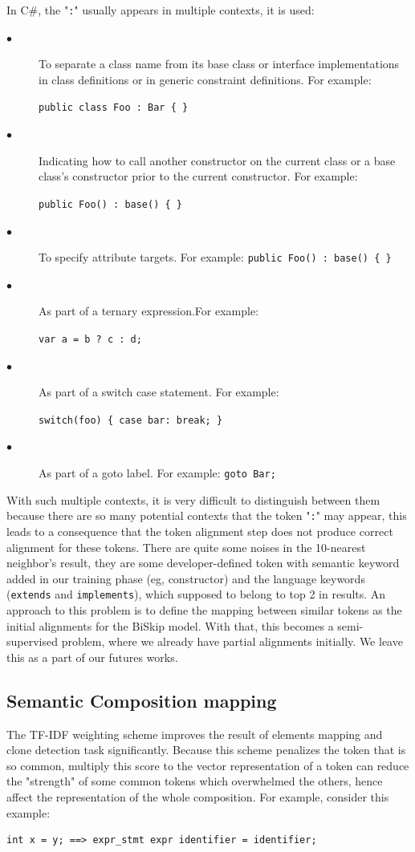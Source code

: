 In C\#, the "\texttt{:}" usually appears in multiple contexts, it is used:

\begin{description}
	\item [$\bullet$] To separate a class name from its base class or interface implementations in class definitions or in generic constraint definitions. For example: 
	
	\texttt{public class Foo : Bar \{ \}}
	\item [$\bullet$] Indicating how to call another constructor on the current class or a base class's constructor prior to the current constructor. For example: 
	
	\texttt{public Foo() : base() \{ \}}
	\item [$\bullet$] To specify attribute targets. For example: \texttt{public Foo() : base() \{ \}}
	\item [$\bullet$] As part of a ternary expression.For example:
	
	\texttt{var a = b ? c : d;}
	\item [$\bullet$] As part of a switch case statement. For example:
	
	\texttt{switch(foo) \{ case bar: break; \}}
	\item [$\bullet$] As part of a goto label. For example:
	\texttt{goto Bar;}
	
\end{description}

With such multiple contexts, it is very difficult to distinguish between them because there are so many potential contexts that the token "\texttt{:}" may appear, this leads to a consequence that the token alignment step does not produce correct alignment for these tokens. There are quite some noises in the 10-nearest neighbor's result, they are some developer-defined token with semantic keyword added in our training phase (eg, constructor) and the language keywords (\texttt{extends} and \texttt{implements}), which supposed to belong to top 2 in results. An approach to this problem is to define the mapping between similar tokens as the initial alignments for the BiSkip model. With that, this becomes a semi-supervised problem, where we already have partial alignments initially. We leave this as a part of our futures works.

\subsection{Semantic Composition mapping}
The TF-IDF weighting scheme improves the result of elements mapping and clone detection task significantly. Because this scheme penalizes the token that is so common, multiply this score to the vector representation of a token can reduce the "strength" of some common tokens which overwhelmed the others, hence affect the representation of the whole composition. For example, consider this example:
\begin{lstlisting}
int x = y; ==> expr_stmt expr identifier = identifier;
\end{lstlisting}

